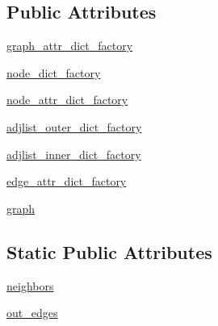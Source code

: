 \subsection*{Public Attributes}
\begin{DoxyCompactItemize}
\item 
\hyperlink{classnetworkx_1_1classes_1_1digraph_1_1DiGraph_ae718de1505ae7db9a2e7fcfc75427bed}{graph\+\_\+attr\+\_\+dict\+\_\+factory}
\item 
\hyperlink{classnetworkx_1_1classes_1_1digraph_1_1DiGraph_a90c4f099cd358abf9942d0e92441afb6}{node\+\_\+dict\+\_\+factory}
\item 
\hyperlink{classnetworkx_1_1classes_1_1digraph_1_1DiGraph_a1831f2aabf74217480198a35f65ab707}{node\+\_\+attr\+\_\+dict\+\_\+factory}
\item 
\hyperlink{classnetworkx_1_1classes_1_1digraph_1_1DiGraph_aecd838a6fad8dac266e1c0e7fb9cbbcb}{adjlist\+\_\+outer\+\_\+dict\+\_\+factory}
\item 
\hyperlink{classnetworkx_1_1classes_1_1digraph_1_1DiGraph_aa7fd727d37c7f284c8065aa46e734b11}{adjlist\+\_\+inner\+\_\+dict\+\_\+factory}
\item 
\hyperlink{classnetworkx_1_1classes_1_1digraph_1_1DiGraph_a15d4eaca4dcd933431549f7bb4dafae3}{edge\+\_\+attr\+\_\+dict\+\_\+factory}
\item 
\hyperlink{classnetworkx_1_1classes_1_1digraph_1_1DiGraph_a73203a556963c7e679d4ff0ea4eb8420}{graph}
\end{DoxyCompactItemize}
\subsection*{Static Public Attributes}
\begin{DoxyCompactItemize}
\item 
\hyperlink{classnetworkx_1_1classes_1_1digraph_1_1DiGraph_aa91a24d90245d8a3346ee2e4a01f9044}{neighbors}
\item 
\hyperlink{classnetworkx_1_1classes_1_1digraph_1_1DiGraph_af92f2fb66e808da9034f57ee1de3c548}{out\+\_\+edges}
\end{DoxyCompactItemize}


